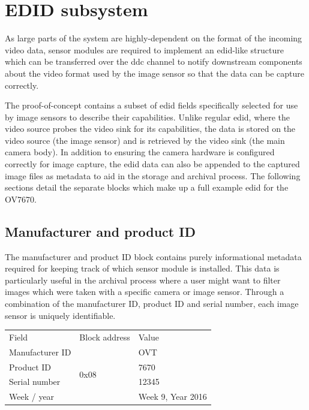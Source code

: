 \section{EDID subsystem}

As large parts of the system are highly-dependent on the format of the incoming video data, sensor modules are required to implement an \gls{edid}-like structure which can be transferred over the \gls{ddc} channel to notify downstream components about the video format used by the image sensor so that the data can be capture correctly.

The proof-of-concept contains a subset of \gls{edid} fields specifically selected for use by image sensors to describe their capabilities. Unlike regular \gls{edid}, where the video source probes the video sink for its capabilities, the data is stored on the video source (the image sensor) and is retrieved by the video sink (the main camera body). In addition to ensuring the camera hardware is configured correctly for image capture, the \gls{edid} data can also be appended to the captured image files as metadata to aid in the storage and archival process. The following sections detail the separate blocks which make up a full example \gls{edid} for the OV7670.

\subsection{Manufacturer and product ID}
The manufacturer and product ID block contains purely informational metadata required for keeping track of which sensor module is installed. This data is particularly useful in the archival process where a user might want to filter images which were taken with a specific camera or image sensor. Through a combination of the manufacturer ID, product ID and serial number, each image sensor is uniquely identifiable.  

\begin{table}
    \begin{tabular}{lll}
        Field               & Block address             & Value             \\
        Manufacturer ID     & \multirow{5}{*}{0x08}     & OVT               \\
        Product ID          &                           & 7670              \\
        Serial number       &                           & 12345             \\
        Week / year         &                           & Week 9, Year 2016 \\
    \end{tabular}
\end{table}

